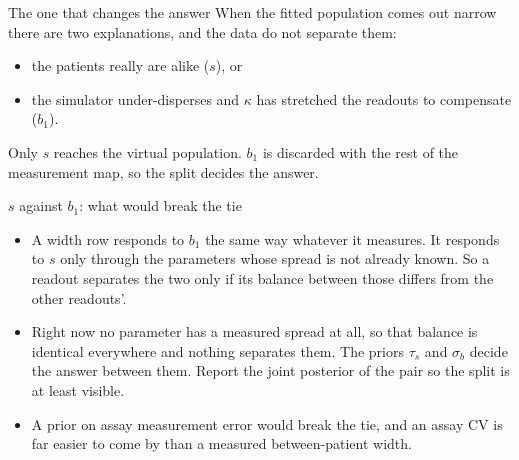 \documentclass[10pt,aspectratio=169]{beamer}
\begin{document}
\begin{frame}[t]{The one that changes the answer}
  When the fitted population comes out narrow there are two explanations, and the
  data do not separate them:
  \begin{itemize}\setlength\itemsep{6pt}
    \item the patients really are alike ($s$), or
    \item the simulator under-disperses and $\kappa$ has stretched the readouts
      to compensate ($b_1$).
  \end{itemize}
  \vfill
  \alert{Only $s$ reaches the virtual population.} $b_1$ is discarded with the
  rest of the measurement map, so the split decides the answer.
\end{frame}

\begin{frame}[t]{$s$ against $b_1$: what would break the tie}
  \begin{itemize}\setlength\itemsep{9pt}
    \item A width row responds to $b_1$ the same way whatever it measures. It
      responds to $s$ only through the parameters whose spread is not already
      known. So a readout separates the two only if its balance between those
      differs from the other readouts'.
    \item \alert{Right now no parameter has a measured spread at all}, so that
      balance is identical everywhere and nothing separates them. The priors
      $\tau_s$ and $\sigma_b$ decide the answer between them. Report the joint
      posterior of the pair so the split is at least visible.
    \item A prior on assay measurement error would break the tie, and an assay
      CV is far easier to come by than a measured between-patient width.
  \end{itemize}
\end{frame}

\appendix
\end{document}
